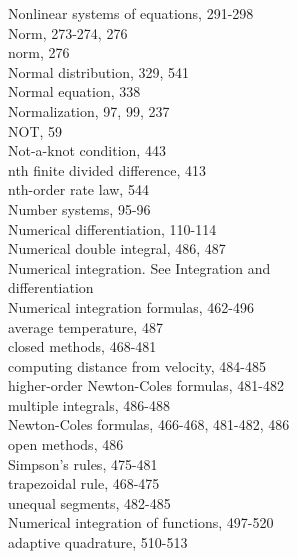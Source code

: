\documentclass[../main.tex]{subfiles}
\begin{document}
\begin{multicols}{3}
    Nonlinear systems of equations, 291-298\\
    Norm, 273-274, 276\\
    norm, 276\\
    Normal distribution, 329, 541\\
    Normal equation, 338\\
    Normalization, 97, 99, 237\\
    NOT, 59\\
    Not-a-knot condition, 443\\
    nth finite divided difference, 413\\
    nth-order rate law, 544\\
    Number systems, 95-96\\
    Numerical differentiation, 110-114\\
    Numerical double integral, 486, 487\\
    Numerical integration. See Integration and\\
    differentiation\\
    Numerical integration formulas, 462-496\\
    \hspace*{3mm}average temperature, 487\\
    \hspace*{3mm}closed methods, 468-481\\
    \hspace*{3mm}computing distance from velocity, 484-485\\
    \hspace*{3mm}higher-order Newton-Coles formulas, 481-482\\
    \hspace*{3mm}multiple integrals, 486-488\\
    \hspace*{3mm}Newton-Coles formulas, 466-468, 481-482, 486\\
    \hspace*{3mm}open methods, 486\\
    \hspace*{3mm}Simpson's rules, 475-481\\
    \hspace*{3mm}trapezoidal rule, 468-475\\
    \hspace*{3mm}unequal segments, 482-485\\
    Numerical integration of functions, 497-520\\
    \hspace*{3mm}adaptive quadrature, 510-513\\

\end{multicols}
\end{document}
